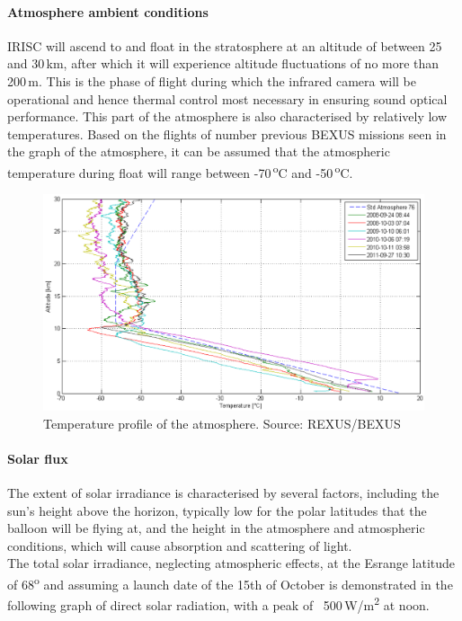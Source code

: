 \paragraph{Atmosphere ambient conditions}
IRISC will ascend to and float in the stratosphere at an altitude of between 25 and 30\,km, after which it will experience altitude fluctuations of no more than 200\,m. This is the phase of flight during which the infrared camera will be operational and hence thermal control most necessary in ensuring sound optical performance. This part of the atmosphere is also characterised by relatively low temperatures. Based on the flights of number previous BEXUS missions seen in the graph of the atmosphere, it can be assumed that the atmospheric temperature during float will range between -70\,\textsuperscript{o}C and -50\,\textsuperscript{o}C. \\

	\begin{figure}[h!]
    \centering
    \includegraphics[scale=0.6]{4-experiment-design/img/mechanical/atmosphere.PNG}
	\caption{Temperature profile of the atmosphere. Source: REXUS/BEXUS}
	\label{fig:atmosphere}
	\end{figure}



\paragraph{Solar flux}

The extent of solar irradiance is characterised by several factors, including the sun’s height above the horizon, typically low for the polar latitudes that the balloon will be flying at, and the height in the atmosphere and atmospheric conditions, which will cause absorption and scattering of light. \\
The total solar irradiance, neglecting atmospheric effects, at the Esrange latitude of 68\textsuperscript{o} and assuming a launch date of the 15th of October is demonstrated in the following graph of direct solar radiation, with a peak of ~500\,W/m\textsuperscript{2} at noon.\\


